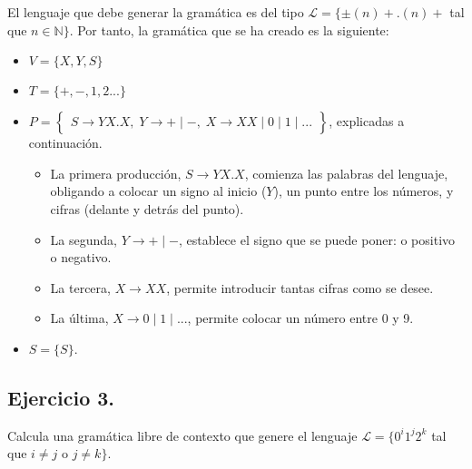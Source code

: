 \documentclass[11pt,a4paper]{article}
\begin{document}
El lenguaje que debe generar la gramática es del tipo $\mathcal{L}=\{\pm (n)+.(n)+$ tal que $n\in \mathbb{N}\}$. Por tanto, la gramática que se ha creado es la siguiente:
	\begin{itemize}
		\item $V=\{X,Y,S\}$
		\item $T=\{+,-,1,2...\}$
		\item $P=\left\{\begin{array}{c}
			S\rightarrow YX.X, \; 
			Y\rightarrow + \mid -, \;
			X\rightarrow XX \mid 0 \mid 1 \mid ...
		\end{array}\right\}$, explicadas a continuación.
		\begin{itemize}
			\item La primera producción, $S\rightarrow YX.X$, comienza las palabras del lenguaje, obligando a colocar un signo al inicio ($Y$), un punto entre los números, y cifras (delante y detrás del punto).
			\item La segunda, $Y\rightarrow +\mid -$, establece el signo que se puede poner: o positivo o negativo.
			\item La tercera, $X\rightarrow XX$, permite introducir tantas cifras como se desee.
			\item La última, $X\rightarrow 0 \mid 1 \mid ...$, permite colocar un número entre 0 y 9.
		\end{itemize}
		\item $S=\{S\}$.
	\end{itemize}

\subsection{Ejercicio 3.} Calcula una gramática libre de contexto que genere el lenguaje $\mathcal{L}=\{0^i1^j2^k$ tal que $i\not = j$ o $j\not = k\}$.
\end{document}
